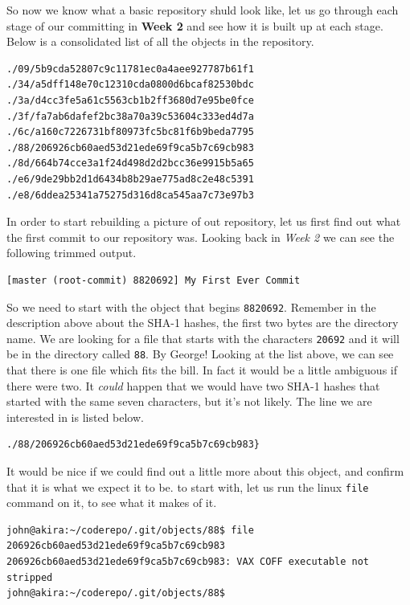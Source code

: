 So now we know what a basic repository shuld look like, let us go through each stage of our committing in \textbf{Week 2} and see how it is built up at each stage.  Below is a consolidated list of all the objects in the repository.  

\begin{Verbatim}[frame=leftline,framerule=1mm,fontsize=\relsize{-3}]
./09/5b9cda52807c9c11781ec0a4aee927787b61f1
./34/a5dff148e70c12310cda0800d6bcaf82530bdc
./3a/d4cc3fe5a61c5563cb1b2ff3680d7e95be0fce
./3f/fa7ab6dafef2bc38a70a39c53604c333ed4d7a
./6c/a160c7226731bf80973fc5bc81f6b9beda7795
./88/206926cb60aed53d21ede69f9ca5b7c69cb983
./8d/664b74cce3a1f24d498d2d2bcc36e9915b5a65
./e6/9de29bb2d1d6434b8b29ae775ad8c2e48c5391
./e8/6ddea25341a75275d316d8ca545aa7c73e97b3
\end{Verbatim}

In order to start rebuilding a picture of out repository, let us first find out what the first commit to our repository was.  Looking back in \emph{Week 2} we can see the following trimmed output.

\begin{Verbatim}[frame=leftline,framerule=1mm,fontsize=\relsize{-3}]
[master (root-commit) 8820692] My First Ever Commit
\end{Verbatim}

So we need to start with the object that begins \texttt{8820692}.  Remember in the description above about the SHA-1 hashes, the first two bytes are the directory name.  We are looking for a file that starts with the characters \texttt{20692} and it will be in the directory called \texttt{88}.  By George!  Looking at the list above, we can see that there is one file which fits the bill.  In fact it would be a little ambiguous if there were two.  It \emph{could} happen that we would have two SHA-1 hashes  that started with the same seven characters, but it's not likely.  The line we are interested in is listed below.

\begin{Verbatim}[frame=leftline,framerule=1mm,fontsize=\relsize{-3}]
./88/206926cb60aed53d21ede69f9ca5b7c69cb983}
\end{Verbatim}

It would be nice if we could find out a little more about this object, and confirm that it is what we expect it to be.  to start with, let us run the linux \texttt{file} command on it, to see what it makes of it.

\begin{Verbatim}[frame=leftline,framerule=1mm,fontsize=\relsize{-3}]
john@akira:~/coderepo/.git/objects/88$ file 206926cb60aed53d21ede69f9ca5b7c69cb983 
206926cb60aed53d21ede69f9ca5b7c69cb983: VAX COFF executable not stripped
john@akira:~/coderepo/.git/objects/88$ 
\end{Verbatim}


